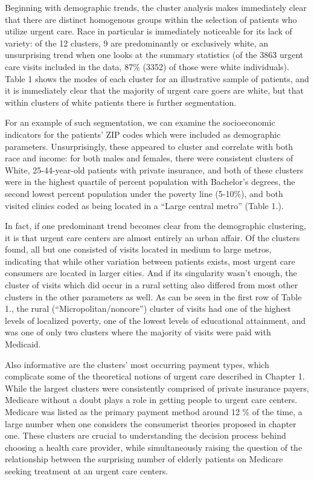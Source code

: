 \documentclass[12pt,twoside]{reedthesis}
\begin{document}
  Beginning with demographic trends, the cluster analysis makes
  immediately clear that there are distinct homogenous groups within the
  selection of patients who utilize urgent care. Race in particular is
  immediately noticeable for its lack of variety: of the 12 clusters, 9
  are predominantly or exclusively white, an unsurprising trend when one
  looks at the summary statistics (of the 3863 urgent care visits included
  in the data, 87\% (3352) of those were white individuals). Table 1 shows
  the modes of each cluster for an illustrative sample of patients, and it
  is immediately clear that the majority of urgent care goers are white,
  but that within clusters of white patients there is further
  segmentation.
  
  For an example of such segmentation, we can examine the socioeconomic
  indicators for the patients' ZIP codes which were included as
  demographic parameters. Unsurprisingly, these appeared to cluster and
  correlate with both race and income: for both males and females, there
  were consistent clusters of White, 25-44-year-old patients with private
  insurance, and both of these clusters were in the highest quartile of
  percent population with Bachelor's degrees, the second lowest percent
  population under the poverty line (5-10\%), and both visited clinics
  coded as being located in a ``Large central metro'' (Table 1.).
  
  In fact, if one predominant trend becomes clear from the demographic
  clustering, it is that urgent care centers are almost entirely an urban
  affair. Of the clusters found, all but one consisted of visits located
  in medium to large metros, indicating that while other variation between
  patients exists, most urgent care consumers are located in larger
  cities. And if its singularity wasn't enough, the cluster of visits
  which did occur in a rural setting also differed from most other
  clusters in the other parameters as well. As can be seen in the first
  row of Table 1., the rural (``Micropolitan/noncore'') cluster of visits
  had one of the highest levels of localized poverty, one of the lowest
  levels of educational attainment, and was one of only two clusters where
  the majority of visits were paid with Medicaid.
  
  Also informative are the clusters' most occurring payment types, which
  complicate some of the theoretical notions of urgent care described in
  Chapter 1. While the largest clusters were consistently comprised of
  private insurance payers, Medicare without a doubt plays a role in
  getting people to urgent care centers. Medicare was listed as the
  primary payment method around 12 \% of the time, a large number when one
  considers the consumerist theories proposed in chapter one. These
  clusters are crucial to understanding the decision process behind
  choosing a health care provider, while simultaneously raising the
  question of the relationship between the surprising number of elderly
  patients on Medicare seeking treatment at an urgent care centers.
  
\end{document}
